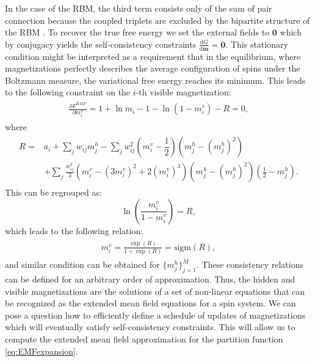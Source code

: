 In the case of the RBM, the third term consists only of the sum of pair connection because the coupled triplets are excluded by the bipartite structure of the RBM \cite{gabrie2015training}. To recover the true free energy we set the external fields to $\mathbf{0}$ which by conjugacy yields the self-consistency constraints $\frac{\text{d}G}{\text{d} \mathbf{m}} = \mathbf{0}$.
This stationary condition might be interpreted as a requirement that in the equilibrium, where magnetizations perfectly describes the average configuration of spins under the Boltzmann measure, the variational free energy reaches its minimum. This leads to the following constraint on the $i$-th visible magnetization:
\begin{align}
\begin{split}
 \frac{\partial F^{EMF
}}{\partial m_i^v} = 1 + \ln m_i - 1 - \ln (1 - m_i^v) -R =  0,
\end{split}
\end{align}
where 
\begin{align}
\begin{split}
R = & a_i + \sum_j w_{ij}m_j^h - \sum_j w_{ij}^2 \left( m_i^v - \dfrac{1}{2}\right) \left(m_j^h - (m_j^h)^2\right) \\
& + \sum_j \frac{w_{ij}^3}{3}\left( m_i^v - (3m_i^v)^2 + 2 (m_i^v)^3\right) (m_j^h - (m_j^h)^2)(\frac{1}{2} - m_j^h) .
\end{split}
\end{align}
This can be regrouped as:
$$ \ln \left(\frac{m_i^v}{1 - m_i^v} \right) = R,$$
which leads to the following relation:
\begin{align}
\begin{split} m_i^v = \frac{\exp(R)}{1 + \exp(R)} = \text{sigm}(R),
\end{split}
\label{eq:selfConst}
\end{align}
and similar condition can be obtained for $ \{ m_j^h \}_{j=1}^M$. These consistency relations can be defined for an arbitrary order of approximation. Thus, the hidden and visible magnetizations are the solutions of a set of non-linear equations that can be recognized as the extended mean field equations for a spin system. We can pose a question how to efficiently define a schedule of updates of magnetizations which will eventually satisfy self-consistency constraints. This will allow us to compute the extended mean field approximation for the partition function \ref{eq:EMFexpansion}.

